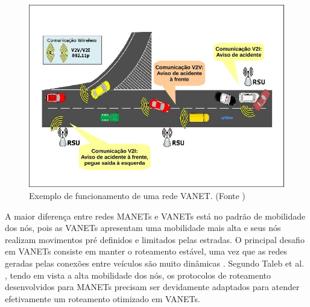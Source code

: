 \begin{figure}[!ht]
  \centerline{\includegraphics[scale=0.6]{imagens/vanet-comunicacao.jpg}}
  \caption[Shorter figure  caption]{Exemplo de funcionamento de  uma rede VANET.
(Fonte \cite{vehicular})} \label{fig:cen-vanet}
\end{figure}

A  maior diferença  entre  redes MANETs  e VANETs  está  no padrão  de
mobilidade dos nós, pois as VANETs apresentam uma mobilidade mais alta
e  seus  nós  realizam  movimentos pré  definidos  e  limitados  pelas
estradas.   O  principal  desafio  em  VANETs  consiste  em  manter  o
roteamento estável, uma vez que  as redes geradas pelas conexões entre
veículos são  muito dinâmicas  \cite{mustafa:2011}.  Segundo  Taleb et
al. \cite{taleb:2007},  tendo em vista  a alta mobilidade dos  nós, os
protocolos  de  roteamento  desenvolvidos  para  MANETs  precisam  ser
devidamente   adaptados  para   atender  efetivamente   um  roteamento
otimizado em VANETs.

